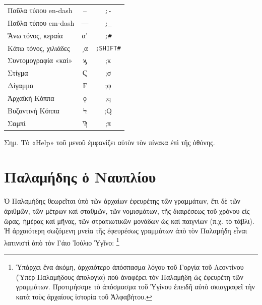 \documentclass[12pt,a4paper]{article}
\begin{document}
\begin{center}
{\begin{tabularx}{12cm}{lcC}
      Παῦλα τύπου en-dash            &  –   &  \texttt{;-}                    \\
      Παῦλα τύπου em-dash            &  —   &  \texttt{;{\_}}                 \\
      Ἄνω τόνος, κεραία              &  αʹ  &  \texttt{;\#}                   \\
      Κάτω τόνος, χιλιάδες           & ͵α   &  \texttt{;{\small SHIFT}\#}     \\
      Συντομογραφία «καί»            &  ϗ   &  ;κ                             \\
      Στίγμα                         &  Ϛ   &  ;σ                             \\
      Δίγαμμα                        &  Ϝ   &  ;φ                             \\
      Ἀρχαϊκὴ Κόππα                  &  ϙ   &  ;q                             \\
      Βυζαντινὴ Κόππα                &  Ϟ   &  ;Q                             \\
      Σαμπί                          &  Ϡ   &  ;π                  \\\bottomrule
      \end{tabularx}
    }
  \end{center}  
  \vspace{.3cm}
  Σημ. Τὸ «Help» τοῦ μενοῦ ἐμφανίζει αὐτὸν τὸν πίνακα ἐπὶ τῆς ὀθόνης.
\newpage


\section*{Παλαμήδης ὁ Ναυπλίου}

  Ὁ Παλαμήδης θεωρεῖται ὑπὸ τῶν ἀρχαίων ἐφευρέτης τῶν γραμμάτων, ἔτι δὲ τῶν
  ἀριθμῶν, τῶν μέτρων καὶ σταθμῶν, τῶν νομισμάτων, τῆς διαιρέσεως τοῦ
  χρόνου εἰς ὥρας, ἡμέρας καὶ μῆνας, τῶν στρατιωτικῶν μονάδων ὡς καὶ
  παιγνίων (π.χ. τὸ τάβλι). Ἡ ἀρχαιότερη σωζόμενη μνεία τῆς ἐφευρέσως
  γραμμάτων ἀπὸ τὸν Παλαμήδη εἶναι λατινιστὶ ἀπὸ τὸν Γάιο Ἰούλιο Ὑγῖνο:
  \footnote{Ὑπάρχει ἕνα ἀκόμη, ἀρχαιότερο
      ἀπόσπασμα λόγου τοῦ Γοργία τοῦ Λεοντίνου (Ὑπὲρ Παλαμήδους ἀπολογία) 
      ποὺ ἀναφέρει τὸν Παλαμήδη ὡς ἐφευρέτη τῶν γραμμάτων. Προτιμήσαμε 
      τὸ ἀπόσμασμα τοῦ Ὑγίνου ἐπειδῆ αὐτὸ σκιαγραφεῖ τὴν κατὰ τοὺς ἀρχαίους
      ἱστορία τοῦ Ἀλφαβήτου.}
\end{document}
